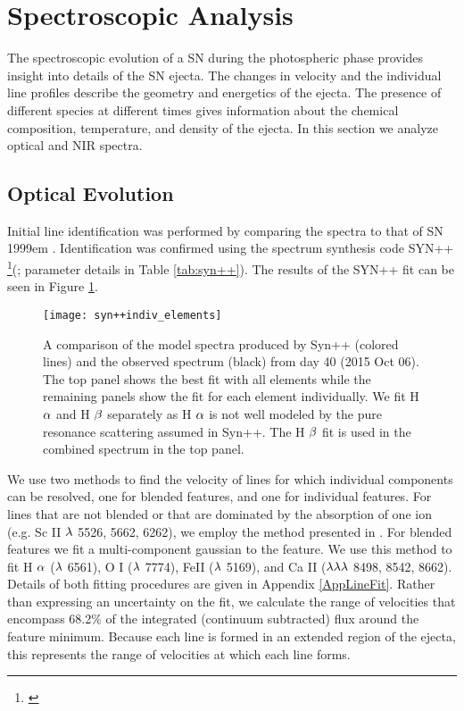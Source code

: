 \documentclass[a4paper,fleqn,usenatbib]{mnras}
\begin{document}
\section{Spectroscopic Analysis} \label{sec:SpecEvolve}
The spectroscopic evolution of a SN during the photospheric phase provides insight into details of the SN ejecta.
The changes in velocity and the individual line profiles describe the geometry and energetics of the ejecta. 
The presence of different species at different times gives information about the chemical composition, temperature, and density of the ejecta.
In this section we analyze optical and NIR spectra.
\subsection{Optical Evolution} \label{OpticalEvolve}
Initial line identification was performed by comparing the spectra to that of SN 1999em \citep{2001leonard}. 
Identification was confirmed using the spectrum synthesis code SYN++ \footnote{\citet{2013thomas}}(\citealt{2011thomas}; parameter details in Table \ref{tab:syn++}). 
The results of the SYN++ fit can be seen in Figure \ref{fig:syn++}.
\begin{figure*}
\begin{center}
\texttt{[image: syn++indiv\_elements]} %
\caption{A comparison of the model spectra produced by Syn++ (colored lines) and the observed spectrum (black) from day 40 (2015 Oct 06).
The top panel shows the best fit with all elements while the remaining panels show the fit for each element individually.
We fit H $\rm{\alpha}$ and H $\rm{\beta}$ separately as H $\rm{\alpha}$ is not well modeled by the pure resonance scattering assumed in Syn++.
The H $\rm{\beta}$ fit is used in the combined spectrum in the top panel.}
\label{fig:syn++}
\end{center}
\end{figure*}

We use two methods to find the velocity of lines for which individual components can be resolved, one for blended features, and one for individual features.
For lines that are not blended or that are dominated by the absorption of one ion (e.g. Sc II $\rm{\lambda}$ 5526, 5662, 6262), we employ the method presented in \citet{2012silverman}. 
For blended features we fit a multi-component gaussian to the feature.
We use this method to fit H $\rm{\alpha}$ ($\rm{\lambda}$ 6561), O I ($\rm{\lambda}$ 7774), FeII ($\rm{\lambda}$ 5169), and Ca II ($\rm{\lambda\lambda\lambda}$ 8498, 8542, 8662). 
Details of both fitting procedures are given in Appendix \ref{AppLineFit}.
Rather than expressing an uncertainty on the fit, we calculate the range of velocities that encompass 68.2\% of the integrated (continuum subtracted) flux around the feature minimum.
Because each line is formed in an extended region of the ejecta, this represents the range of velocities at which each line forms.
\end{document}
